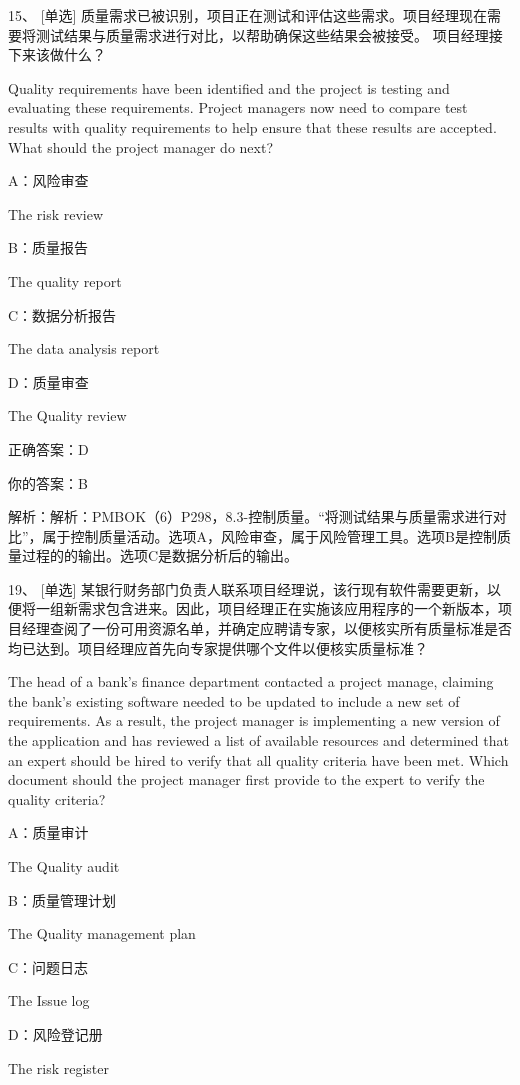 15、 [单选] 质量需求已被识别，项目正在测试和评估这些需求。项目经理现在需要将测试结果与质量需求进行对比，以帮助确保这些结果会被接受。 项目经理接下来该做什么？

Quality requirements have been identified and the project is testing and evaluating these requirements. Project managers now need to compare test results with quality requirements to help ensure that these results are accepted. What should the project manager do next?

A：风险审查

The risk review

B：质量报告

The quality report

C：数据分析报告

The data analysis report

D：质量审查

The Quality review

正确答案：D

你的答案：B

解析：解析：PMBOK（6）P298，8.3-控制质量。“将测试结果与质量需求进行对比”，属于控制质量活动。选项A，风险审查，属于风险管理工具。选项B是控制质量过程的的输出。选项C是数据分析后的输出。


19、 [单选] 某银行财务部门负责人联系项目经理说，该行现有软件需要更新，以便将一组新需求包含进来。因此，项目经理正在实施该应用程序的一个新版本，项目经理查阅了一份可用资源名单，并确定应聘请专家，以便核实所有质量标准是否均已达到。项目经理应首先向专家提供哪个文件以便核实质量标准？

The head of a bank's finance department contacted a project manage, claiming the bank's existing software needed to be updated to include a new set of requirements. As a result, the project manager is implementing a new version of the application and has reviewed a list of available resources and determined that an expert should be hired to verify that all quality criteria have been met. Which document should the project manager first provide to the expert to verify the quality criteria?

A：质量审计

The Quality audit

B：质量管理计划

The Quality management plan

C：问题日志

The Issue log

D：风险登记册

The risk register

